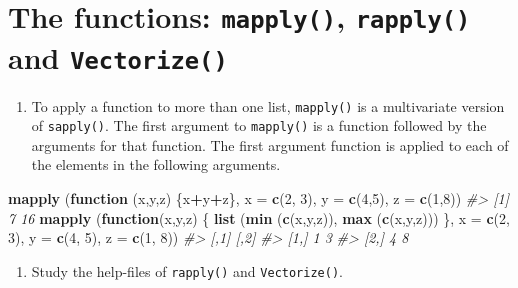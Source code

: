 \documentclass[
]{book}
\newenvironment{Shaded}{\begin{snugshade}}{\end{snugshade}}
\newcommand{\AttributeTok}[1]{\textcolor[rgb]{0.13,0.29,0.53}{#1}}
\newcommand{\CommentTok}[1]{\textcolor[rgb]{0.56,0.35,0.01}{\textit{#1}}}
\newcommand{\ControlFlowTok}[1]{\textcolor[rgb]{0.13,0.29,0.53}{\textbf{#1}}}
\newcommand{\DecValTok}[1]{\textcolor[rgb]{0.00,0.00,0.81}{#1}}
\newcommand{\FunctionTok}[1]{\textcolor[rgb]{0.13,0.29,0.53}{\textbf{#1}}}
\newcommand{\NormalTok}[1]{#1}
\newcommand{\SpecialCharTok}[1]{\textcolor[rgb]{0.81,0.36,0.00}{\textbf{#1}}}
\providecommand{\tightlist}{%
  \setlength{\itemsep}{0pt}\setlength{\parskip}{0pt}}
\begin{document}
\section{\texorpdfstring{The functions: \texttt{mapply()}, \texttt{rapply()} and \texttt{Vectorize()}}{The functions: mapply(), rapply() and Vectorize()}}\label{the-functions-mapply-rapply-and-vectorize}

\begin{enumerate}
\def\labelenumi{(\alph{enumi})}
\tightlist
\item
  To apply a function to more than one list, \texttt{mapply()} is a multivariate version of \texttt{sapply()}. The first argument to \texttt{mapply()} is a function followed by the arguments for that function. The first argument function is applied to each of the elements in the following arguments.
\end{enumerate}

\begin{Shaded}
\begin{Highlighting}[]
\FunctionTok{mapply}\NormalTok{ (}\ControlFlowTok{function}\NormalTok{ (x,y,z) \{x}\SpecialCharTok{+}\NormalTok{y}\SpecialCharTok{+}\NormalTok{z\}, }\AttributeTok{x =} \FunctionTok{c}\NormalTok{(}\DecValTok{2}\NormalTok{, }\DecValTok{3}\NormalTok{), }\AttributeTok{y =} \FunctionTok{c}\NormalTok{(}\DecValTok{4}\NormalTok{,}\DecValTok{5}\NormalTok{), }\AttributeTok{z =} \FunctionTok{c}\NormalTok{(}\DecValTok{1}\NormalTok{,}\DecValTok{8}\NormalTok{))}
\CommentTok{\#\textgreater{} [1]  7 16}
\FunctionTok{mapply}\NormalTok{ (}\ControlFlowTok{function}\NormalTok{(x,y,z) \{ }\FunctionTok{list}\NormalTok{ (}\FunctionTok{min}\NormalTok{ (}\FunctionTok{c}\NormalTok{(x,y,z)), }\FunctionTok{max}\NormalTok{ (}\FunctionTok{c}\NormalTok{(x,y,z))) \}, }
        \AttributeTok{x =} \FunctionTok{c}\NormalTok{(}\DecValTok{2}\NormalTok{, }\DecValTok{3}\NormalTok{), }\AttributeTok{y =} \FunctionTok{c}\NormalTok{(}\DecValTok{4}\NormalTok{, }\DecValTok{5}\NormalTok{), }\AttributeTok{z =} \FunctionTok{c}\NormalTok{(}\DecValTok{1}\NormalTok{, }\DecValTok{8}\NormalTok{))}
\CommentTok{\#\textgreater{}      [,1] [,2]}
\CommentTok{\#\textgreater{} [1,] 1    3   }
\CommentTok{\#\textgreater{} [2,] 4    8}
\end{Highlighting}
\end{Shaded}

\begin{enumerate}
\def\labelenumi{(\alph{enumi})}
\setcounter{enumi}{1}
\tightlist
\item
  Study the help-files of \texttt{rapply()} and \texttt{Vectorize()}.
\end{enumerate}
\end{document}
